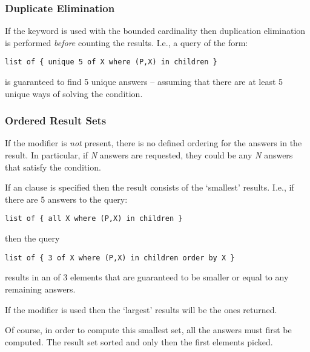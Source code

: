 \subsubsection{Duplicate Elimination}
If the  keyword is used with the bounded cardinality then duplication elimination is performed \emph{before} counting the results. I.e., a query of the form:
\begin{lstlisting}
list of { unique 5 of X where (P,X) in children }
\end{lstlisting}
is guaranteed to find 5 unique answers -- assuming that there are at least 5 unique ways of solving the  condition.

\subsubsection{Ordered Result Sets}
If the  modifier is \emph{not} present, there is no defined ordering for the answers in the result. In particular, if \emph{N} answers are requested, they could be any \emph{N} answers that satisfy the condition.

If an  clause is specified then the result consists of the `smallest' results. I.e., if there are 5 answers to the query:
\begin{lstlisting}
list of { all X where (P,X) in children }
\end{lstlisting}
then the query
\begin{lstlisting}
list of { 3 of X where (P,X) in children order by X }
\end{lstlisting}
results in an  of 3 elements that are guaranteed to be smaller or equal to any remaining answers.

If the  modifier is used then the `largest' results will be the ones returned.
\begin{aside}
Of course, in order to compute this smallest set, all the answers must first be computed. The result set sorted and only then the first elements picked.
\end{aside}

%

